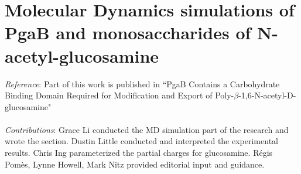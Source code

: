 % 


\chapter[MD simulations of PgaB-glucosamine binding]{Molecular Dynamics simulations of PgaB and monosaccharides of N-acetyl-glucosamine}

\emph{Reference}: Part of this work is published in ``PgaB Contains a Carbohydrate Binding Domain Required for Modification and Export of Poly-$\beta$-1,6-N-acetyl-D-glucosamine"
\\
\\
\emph{Contributions}:
Grace Li conducted the MD simulation part of the research and wrote the section. Dustin Little conducted and interpreted the experimental results. Chris Ing parameterized the partial charges for glucosamine. R\'{e}gis Pom\`{e}s, Lynne Howell, Mark Nitz provided editorial input and guidance.

\newpage

